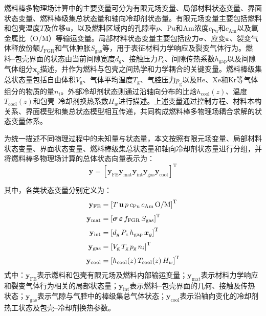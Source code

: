 \label{subsec:ch2_variables_coupling}

燃料棒多物理场计算中的主要变量可分为有限元场变量、局部材料状态变量、界面状态变量、燃料棒级集总状态量和轴向冷却剂状态量。有限元场变量主要包括燃料和包壳温度$T$及位移$\mathbf{u}$，以及燃料区域内的孔隙率$p$、Pu和Am浓度$c_{\mathrm{Pu}}$和$c_{\mathrm{Am}}$以及氧金属比（O/M）等输运变量。局部材料状态变量主要包括应力$\boldsymbol{\sigma}$、应变$\boldsymbol{\varepsilon}$、裂变气体释放份额$f_{\mathrm{FGR}}$和气体肿胀$S_{\mathrm{gas}}$等，用于表征材料力学响应及裂变气体行为。燃料--包壳界面的状态由当前间隙宽度$d_g$、接触压力$P_c$、间隙传热系数$h_{\mathrm{gap}}$以及间隙气体组分$\boldsymbol{x}_g$描述，并作为燃料与包壳之间热学和力学耦合的关键变量。燃料棒级集总状态量包括自由体积$V_{\mathrm g}$、气体平均温度$T_{\mathrm g}$、气腔压力$p_{\mathrm g}$以及He、Xe和Kr等气体组分的物质的量$n_i$。外部冷却剂状态则通过沿轴向分布的比{\rarecharfont 焓}$h_{\mathrm{cool}}(z)$、温度$T_{\mathrm{cool}}(z)$和包壳--冷却剂换热系数$H_w$进行描述。上述变量通过控制方程、材料本构关系、界面模型和集总状态模型相互传递，共同构成燃料棒多物理场耦合求解的状态变量体系。

为统一描述不同物理过程中的未知量与状态量，本文按照有限元场变量、局部材料状态变量、界面状态变量、燃料棒级集总状态量和轴向冷却剂状态量进行分组，并将燃料棒多物理场计算的总体状态向量表示为：
\begin{equation}
	\mathbf y=
	\left[
		\mathbf y_{\mathrm{FE}}
		\mathbf y_{\mathrm{mat}}
		\mathbf y_{\mathrm{int}}
		\mathbf y_{\mathrm{gas}}
		\mathbf y_{\mathrm{cool}}
		\right]^{\mathrm T}
	\label{eq:ch2_state_vector}
\end{equation}

其中，各类状态变量分别定义为：
\begin{align}
	\mathbf y_{\mathrm{FE}}
	 & =
	\left[
		T\,
		\mathbf u\,
		p\,
		c_{\mathrm{Pu}}\,
		c_{\mathrm{Am}}\,
		\mathrm{O/M}
		\right]^{\mathrm T}
	\notag
	\\[0.5ex]
	\mathbf y_{\mathrm{mat}}
	 & =
	\left[
		\boldsymbol{\sigma}\,
		\boldsymbol{\varepsilon}\,
		f_{\mathrm{FGR}}\,
		S_{\mathrm{gas}}
		\right]^{\mathrm T}
	\notag
	\\[0.5ex]
	\mathbf y_{\mathrm{int}}
	 & =
	\left[
		d_g\,
		P_c\,
		h_{\mathrm{gap}}\,
		\boldsymbol{x}_g
		\right]^{\mathrm T}
	\notag
	\\[0.5ex]
	\mathbf y_{\mathrm{gas}}
	 & =
	\left[
		V_{\mathrm g}\,
		T_{\mathrm g}\,
		p_{\mathrm g}\,
		n_i
		\right]^{\mathrm T}
	\notag
	\\[0.5ex]
	\mathbf y_{\mathrm{cool}}
	 & =
	\left[
		h_{\mathrm{cool}}(z)\,
		T_{\mathrm{cool}}(z)\,
		H_w
		\right]^{\mathrm T}
	\label{eq:ch2_state_subvectors}
\end{align}
\noindent 式中：$\mathbf y_{\mathrm{FE}}$表示燃料和包壳有限元场及燃料内部输运变量；$\mathbf y_{\mathrm{mat}}$表示材料力学响应和裂变气体行为相关的局部状态量；$\mathbf y_{\mathrm{int}}$表示燃料--包壳界面的几何、接触及传热状态；$\mathbf y_{\mathrm{gas}}$表示气隙与气腔中的棒级集总气体状态；$\mathbf y_{\mathrm{cool}}$表示沿轴向变化的冷却剂热工状态及包壳--冷却剂换热参数。

